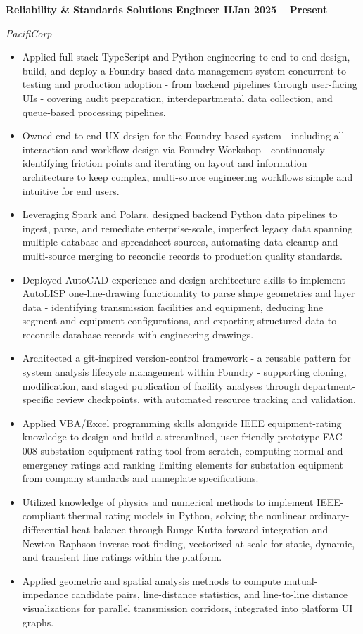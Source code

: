 \documentclass[10pt, letterpaper]{article}
\newcommand{\jobline}[2]{%
  \vspace{5pt}%
  \noindent\textbf{#1}\hfill\textbf{#2}\par%
  \vspace{1pt}%
}
\newcommand{\subline}[1]{%
  \vspace{-1pt}%
  \noindent\textit{#1}\par%
  \vspace{1pt}%
}
\newenvironment{rlist}{%
  \begin{itemize}[leftmargin=1.4em, itemsep=1pt, topsep=2pt, parsep=0pt]%
}{%
  \end{itemize}%
}
\begin{document}
\jobline{Reliability \& Standards Solutions Engineer II}{Jan 2025 -- Present}
\subline{PacifiCorp}
\begin{rlist}
  \item Applied full-stack TypeScript and Python engineering to end-to-end design, build, and deploy a Foundry-based data management system concurrent to testing and production adoption - from backend pipelines through user-facing UIs - covering audit preparation, interdepartmental data collection, and queue-based processing pipelines.
  \item Owned end-to-end UX design for the Foundry-based system - including all interaction and workflow design via Foundry Workshop - continuously identifying friction points and iterating on layout and information architecture to keep complex, multi-source engineering workflows simple and intuitive for end users.
  \item Leveraging Spark and Polars, designed backend Python data pipelines to ingest, parse, and remediate enterprise-scale, imperfect legacy data spanning multiple database and spreadsheet sources, automating data cleanup and multi-source merging to reconcile records to production quality standards.
  \item Deployed AutoCAD experience and design architecture skills to implement AutoLISP one-line-drawing functionality to parse shape geometries and layer data - identifying transmission facilities and equipment, deducing line segment and equipment configurations, and exporting structured data to reconcile database records with engineering drawings.
  \item Architected a git-inspired version-control framework - a reusable pattern for system analysis lifecycle management within Foundry - supporting cloning, modification, and staged publication of facility analyses through department-specific review checkpoints, with automated resource tracking and validation.
  \item Applied VBA/Excel programming skills alongside IEEE equipment-rating knowledge to design and build a streamlined, user-friendly prototype FAC-008 substation equipment rating tool from scratch, computing normal and emergency ratings and ranking limiting elements for substation equipment from company standards and nameplate specifications.
  \item Utilized knowledge of physics and numerical methods to implement IEEE-compliant thermal rating models in Python, solving the nonlinear ordinary-differential heat balance through Runge-Kutta forward integration and Newton-Raphson inverse root-finding, vectorized at scale for static, dynamic, and transient line ratings within the platform.
  \item Applied geometric and spatial analysis methods to compute mutual-impedance candidate pairs, line-distance statistics, and line-to-line distance visualizations for parallel transmission corridors, integrated into platform UI graphs.
\end{rlist}
\end{document}
